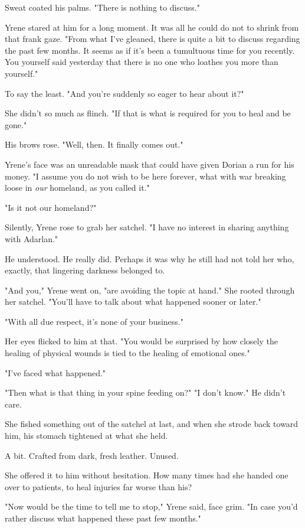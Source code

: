 Sweat coated his palms. "There is nothing to discuss."

Yrene stared at him for a long moment. It was all he could do not to shrink from that frank gaze. "From what I've gleaned, there is quite a bit to discuss regarding the past few months. It seems as if it's been a
 tumultuous time for you recently. You yourself said yesterday that there is no one who loathes you more than yourself."

To say the least. "And you're suddenly so eager to hear about it?"

She didn't so much as flinch. "If that is what is required for you to heal and be gone."

His brows rose. "Well, then. It finally comes out."

Yrene's face was an unreadable mask that could have given Dorian a run for his money. "I assume you do not wish to be here forever, what with war breaking loose in \emph{our} homeland, as you called it."

"Is it not our homeland?"

Silently, Yrene rose to grab her satchel. "I have no interest in sharing anything with Adarlan."

He understood. He really did. Perhaps it was why he still had not told her who, exactly, that lingering darkness belonged to.

"And you," Yrene went on, "are avoiding the topic at hand." She rooted through her satchel. "You'll have to talk about what happened sooner or later."

"With all due respect, it's none of your business."

Her eyes flicked to him at that. "You would be surprised by how closely the healing of physical wounds is tied to the healing of emotional ones."

"I've faced what happened."

"Then what is that thing in your spine feeding on?" "I don't know." He didn't care.

She fished something out of the satchel at last, and when she strode back toward him, his stomach tightened at what she held.

A bit. Crafted from dark, fresh leather. Unused.

She offered it to him without hesitation. How many times had she handed one over to patients, to heal injuries far worse than his?

"Now would be the time to tell me to stop," Yrene said, face grim. "In case you'd rather discuss what happened these past few months."

